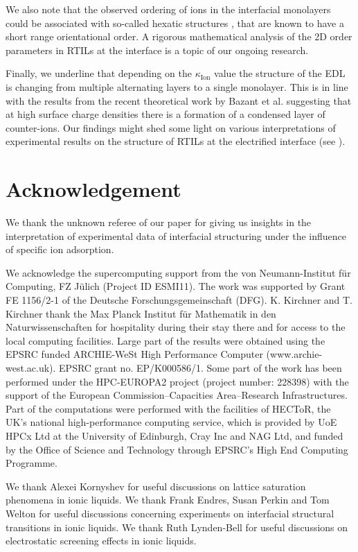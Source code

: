 \documentclass[final,5p,times,twocolumn]{elsarticle}
\begin{document}
We also note that the observed ordering of ions in the interfacial monolayers could be associated with so-called hexatic structures \cite{Strandburg1988}, that are known to have a short range orientational order. A rigorous mathematical analysis of the 2D order parameters in RTILs at the interface is a topic of our ongoing research.

Finally, we underline that depending on the $\kappa_{\mathrm{Ion}}$ value the structure of the EDL is changing from multiple alternating layers to a single monolayer. This is in line with the results from the recent theoretical work by Bazant et al. \cite{Bazant2011} suggesting that at high surface charge densities there is a formation of a condensed layer of counter-ions. Our findings might shed some light on various interpretations of experimental results on the structure of RTILs at the electrified interface (see \cite{Hayes2011,Zhou2012,Lauw2012,Penalber2012}).

\clearpage
\section{Acknowledgement}

We thank the unknown referee of our paper for giving us insights in the interpretation of experimental data of interfacial structuring under the influence of specific ion adsorption.

We acknowledge the supercomputing support from the von Neumann-Institut f{\"u}r Computing, FZ J{\"u}lich (Project ID ESMI11). The work was supported by Grant FE 1156/2-1 of the Deutsche Forschungsgemeinschaft (DFG). K. Kirchner and T. Kirchner thank the Max Planck Institut f{\"u}r Mathematik in den Naturwissenschaften for hospitality during their stay there and for access to the local computing facilities. Large part of the results were obtained using the EPSRC funded ARCHIE-WeSt High Performance Computer (www.archie-west.ac.uk). EPSRC grant no. EP/K000586/1. Some part of the work has been performed under the HPC-EUROPA2 project (project number: 228398) with the support of the European Commission--Capacities Area--Research Infrastructures. Part of the computations were performed with the facilities of HECToR, the UK's national high-performance computing service, which is provided by UoE HPCx Ltd at the University of Edinburgh, Cray Inc and NAG Ltd, and funded by the Office of Science and Technology through EPSRC's High End Computing Programme. 

We thank Alexei Kornyshev for useful discussions on lattice saturation phenomena in ionic liquids. We thank Frank Endres, Susan Perkin and Tom Welton for useful discussions concerning experiments on interfacial structural transitions in ionic liquids. We thank Ruth Lynden-Bell for useful discussions on electrostatic screening effects in ionic liquids.
\end{document}
